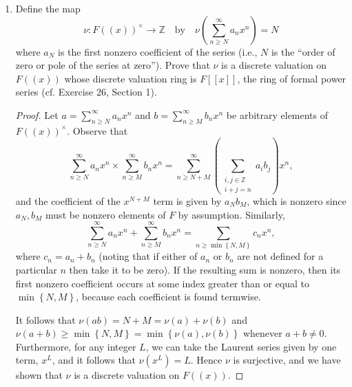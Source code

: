 \documentclass[11pt]{article}
\newcommand{\br}[1]{\left(#1\right)}
\newcommand{\cbr}[1]{\left\{#1\right\}}
\begin{document}
\begin{enumerate}
\begin{enumerate}
\begin{proof}
            Hence $F((x))$ is a field.
        \end{proof}
        \item Define the map \[\nu\colon F((x))^{\times}\to \mathbb{Z}\quad\text{by}\quad \nu\br{\sum_{n\geq N}^{\infty}a_nx^n} = N\] where $a_N$ is the first nonzero coefficient of the series (i.e., $N$ is the ``order of zero or pole of the series at zero''). Prove that $\nu$ is a discrete valuation on $F((x))$ whose discrete valuation ring is $F[[x]]$, the ring of formal power series (cf. Exercise 26, Section 1).
        \begin{proof}
            Let $a = \sum_{n\geq N}^\infty a_nx^n$ and $b = \sum_{n\geq M}^\infty b_nx^n$ be arbitrary elements of $F((x))^\times$. Observe that \[\sum_{n\geq N}^\infty a_nx^n\times \sum_{n\geq M}^\infty b_nx^n = \sum_{n\geq N+M}^\infty\br{\sum_{\substack{i,j\in\mathbb{Z} \\ i+j = n}} a_ib_j}x^n,\] and the coefficient of the $x^{N+M}$ term is given by $a_Nb_M$, which is nonzero since $a_N,b_M$ must be nonzero elements of $F$ by assumption. Similarly, \[\sum_{n\geq N}^{\infty} a_nx^n + \sum_{n\geq M}^{\infty} b_nx^n = \sum_{n\geq \min\cbr{N,M}}c_nx^n,\] where $c_n = a_n+b_n$ (noting that if either of $a_n$ or $b_n$ are not defined for a particular $n$ then take it to be zero). If the resulting sum is nonzero, then its first nonzero coefficient occurs at some index greater than or equal to $\min\cbr{N,M}$, because each coefficient is found termwise.

            It follows that $\nu(ab) = N+M = \nu(a) + \nu(b)$ and $\nu(a+b) \geq \min\cbr{N,M} = \min\cbr{\nu(a),\nu(b)}$ whenever $a+b\neq 0$. Furthermore, for any integer $L$, we can take the Laurent series given by one term, $x^L$, and it follows that $\nu(x^L) = L$. Hence $\nu$ is surjective, and we have shown that $\nu$ is a discrete valuation on $F((x))$.


\end{proof}
\end{enumerate}
\end{enumerate}
\end{document}
